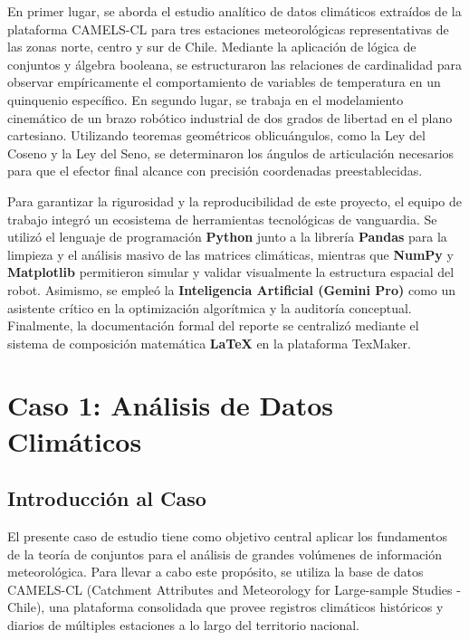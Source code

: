 \documentclass[12pt]{article}
\begin{document}
En primer lugar, se aborda el estudio analítico de datos climáticos extraídos de la plataforma CAMELS-CL para tres estaciones meteorológicas representativas de las zonas norte, centro y sur de Chile. Mediante la aplicación de lógica de conjuntos y álgebra booleana, se estructuraron las relaciones de cardinalidad para observar empíricamente el comportamiento de variables de temperatura en un quinquenio específico. En segundo lugar, se trabaja en el modelamiento cinemático de un brazo robótico industrial de dos grados de libertad en el plano cartesiano. Utilizando teoremas geométricos oblicuángulos, como la Ley del Coseno y la Ley del Seno, se determinaron los ángulos de articulación necesarios para que el efector final alcance con precisión coordenadas preestablecidas.

Para garantizar la rigurosidad y la reproducibilidad de este proyecto, el equipo de trabajo integró un ecosistema de herramientas tecnológicas de vanguardia. Se utilizó el lenguaje de programación \textbf{Python} junto a la librería \textbf{Pandas} para la limpieza y el análisis masivo de las matrices climáticas, mientras que \textbf{NumPy} y \textbf{Matplotlib} permitieron simular y validar visualmente la estructura espacial del robot. Asimismo, se empleó la \textbf{Inteligencia Artificial (Gemini Pro)} como un asistente crítico en la optimización algorítmica y la auditoría conceptual. Finalmente, la documentación formal del reporte se centralizó mediante el sistema de composición matemática \textbf{LaTeX} en la plataforma TexMaker.

\newpage
\section{Caso 1: Análisis de Datos Climáticos}

\subsection{Introducción al Caso}

El presente caso de estudio tiene como objetivo central aplicar los fundamentos de la teoría de conjuntos para el análisis de grandes volúmenes de información meteorológica. Para llevar a cabo este propósito, se utiliza la base de datos CAMELS-CL (Catchment Attributes and Meteorology for Large-sample Studies - Chile), una plataforma consolidada que provee registros climáticos históricos y diarios de múltiples estaciones a lo largo del territorio nacional.
\end{document}
